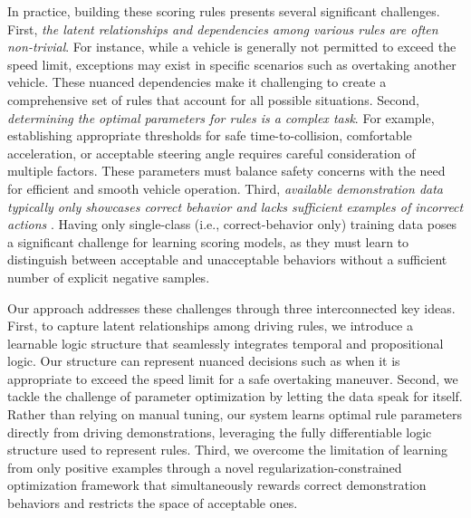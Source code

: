 In practice, building these scoring rules presents several significant challenges. First, \emph{the latent relationships and dependencies among various rules are often non-trivial}. For instance, while a vehicle is generally not permitted to exceed the speed limit, exceptions may exist in specific scenarios such as overtaking another vehicle. These nuanced dependencies make it challenging to create a comprehensive set of rules that account for all possible situations. Second, \emph{determining the optimal parameters for rules is a complex task}. For example, establishing appropriate thresholds for safe time-to-collision, comfortable acceleration, or acceptable steering angle requires careful consideration of multiple factors. These parameters must balance safety concerns with the need for efficient and smooth vehicle operation. Third, \emph{available demonstration data typically only showcases correct behavior and lacks sufficient examples of incorrect actions} \cite{Karnchanachari2024TowardsLP,akhauri2020enhanced,chen2024end}. Having only single-class (i.e., correct-behavior only) training data poses a significant challenge for learning scoring models, as they must learn to distinguish between acceptable and unacceptable behaviors without a sufficient number of explicit negative samples.

Our approach addresses these challenges through three interconnected key ideas. First, to capture latent relationships among driving rules, we introduce a learnable logic structure that seamlessly integrates temporal and propositional logic. Our structure can represent nuanced decisions such as when it is appropriate to exceed the speed limit for a safe overtaking maneuver. Second, we tackle the challenge of parameter optimization by letting the data speak for itself. Rather than relying on manual tuning, our system learns optimal rule parameters directly from driving demonstrations, leveraging the fully differentiable logic structure used to represent rules. Third, we overcome the limitation of learning from only positive examples through a novel regularization-constrained optimization framework that simultaneously rewards correct demonstration behaviors and restricts the space of acceptable ones.

